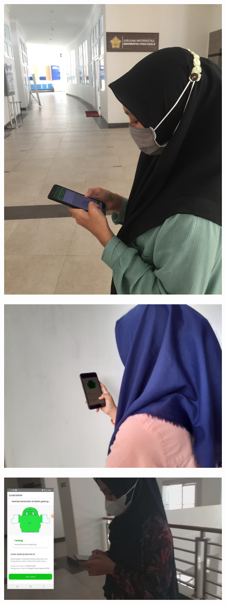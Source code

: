 \begin{figure}[H]
  \center
  \includegraphics [width = 13.5 cm, height= 6.75 cm]{gambar/lampiran/umux4.JPG}
\end{figure}
\begin{figure}[H]
  \center
  \includegraphics [width = 13.5 cm, height= 6.75 cm]{gambar/lampiran/umux2.jpeg}
\end{figure}
\begin{figure}[H]
  \center
  \includegraphics [width = 13.5 cm, height= 6.75 cm]{gambar/lampiran/umux6.jpeg}
\end{figure}


